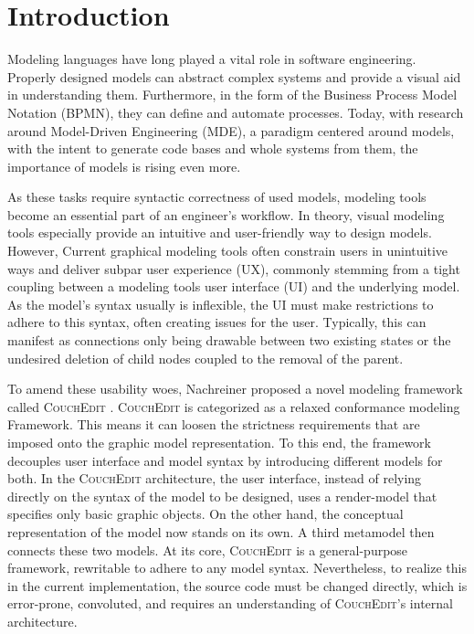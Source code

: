 \chapter{Introduction}
\label{ch:introduction}


Modeling languages have long played a vital role in software engineering. Properly designed models can abstract complex systems and provide a visual aid in understanding them. Furthermore, in the form of the Business Process Model Notation (BPMN), they can define and automate processes. Today, with research around Model-Driven Engineering (MDE), a paradigm centered around models, with the intent to generate code bases and whole systems from them, the importance of models is rising even more.

As these tasks require syntactic correctness of used models, modeling tools become an essential part of an engineer's workflow. In theory, visual modeling tools especially provide an intuitive and user-friendly way to design models. However, Current graphical modeling tools often constrain users in unintuitive ways and deliver subpar user experience (UX), commonly stemming from a tight coupling between a modeling tools user interface (UI) and the underlying model. As the model's syntax usually is inflexible, the UI must make restrictions to adhere to this syntax, often creating issues for the user. Typically, this can manifest as connections only being drawable between two existing states or the undesired deletion of child nodes coupled to the removal of the parent.

To amend these usability woes, Nachreiner proposed a novel modeling framework called \textsc{CouchEdit} \cite{nachreiner_couchedit_2020}. \textsc{CouchEdit} is categorized as a relaxed conformance modeling Framework. This means it can loosen the strictness requirements that are imposed onto the graphic model representation. To this end, the framework decouples user interface and model syntax by introducing different models for both. In the \textsc{CouchEdit} architecture, the user interface, instead of relying directly on the syntax of the model to be designed, uses a render-model that specifies only basic graphic objects. On the other hand, the conceptual representation of the model now stands on its own. A third metamodel then connects these two models. At its core, \textsc{CouchEdit} is a general-purpose framework, rewritable to adhere to any model syntax. Nevertheless, to realize this in the current implementation, the source code must be changed directly, which is error-prone, convoluted, and requires an understanding of \textsc{CouchEdit}'s internal architecture.

